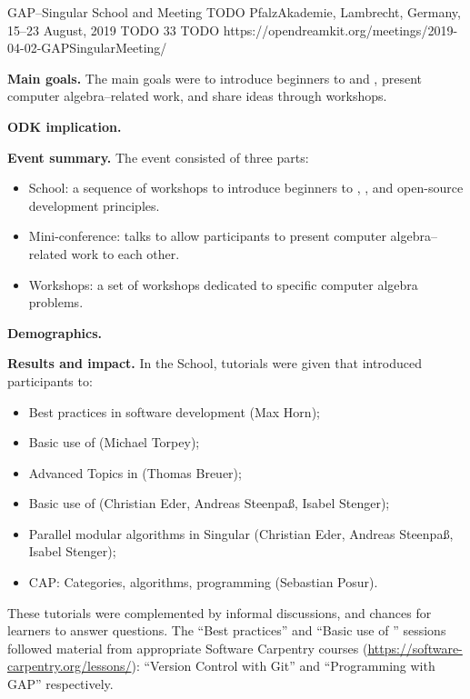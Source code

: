 \begin{event}
  {GAP--Singular School and Meeting}
  {TODO}  %
  {PfalzAkademie, Lambrecht, Germany, 15--23 August, 2019}
  {TODO}  %
  {33}
  {TODO}  %
  {https://opendreamkit.org/meetings/2019-04-02-GAPSingularMeeting/}

\textbf{Main goals.}
The main goals were to introduce beginners to \GAP and \Singular, present
computer algebra--related work, and share ideas through workshops.

\textbf{ODK implication.}

\textbf{Event summary.}
The event consisted of three parts:
\begin{itemize}
\item School: a sequence of workshops to introduce beginners to \GAP, \Singular,
  and open-source development principles.
\item Mini-conference: talks to allow participants to present computer
  algebra--related work to each other.
\item Workshops: a set of workshops dedicated to specific computer algebra
  problems.
\end{itemize}

\textbf{Demographics.}

\textbf{Results and impact.}
In the School, tutorials were given that introduced participants to:
\begin{itemize}
\item Best practices in software development (Max Horn);
\item Basic use of \GAP (Michael Torpey);
\item Advanced Topics in \GAP (Thomas Breuer);
\item Basic use of \Singular (Christian Eder, Andreas Steenpaß, Isabel Stenger);
\item Parallel modular algorithms in Singular (Christian Eder, Andreas Steenpaß, Isabel Stenger);
\item CAP: Categories, algorithms, programming (Sebastian Posur).
\end{itemize}
These tutorials were complemented by informal discussions, and chances for
learners to answer questions.  The ``Best practices'' and ``Basic use of \GAP''
sessions followed material from appropriate Software Carpentry courses
(\url{https://software-carpentry.org/lessons/}): ``Version Control with Git''
and ``Programming with GAP'' respectively.


\end{event}
